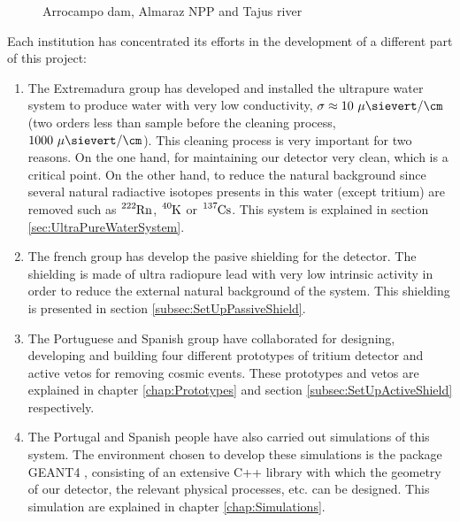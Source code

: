 \begin{figure}[]
 \centering
 \caption{Arrocampo dam, Almaraz NPP and Tajus river}
 \label{fig:Arrocampo}
\end{figure}

Each institution has concentrated its efforts in the development of a different part of this project:

\begin{enumerate}
\item{} The Extremadura group has developed and installed the ultrapure water system to produce water with very low conductivity, $\sigma \approx 10~\mu\sievert/\cm$ (two orders less than sample before the cleaning process, $1000~\mu\sievert/\cm$). This cleaning process is very important for two reasons. On the one hand, for maintaining our detector very clean, which is a critical point. On the other hand, to reduce the natural background since several natural radiactive isotopes presents in this water (except tritium) are removed such as $\ce{^{222}Rn}$, $\ce{^{40}K}$ or $\ce{^{137}Cs}$. This system is explained in section \ref{sec:UltraPureWaterSystem}.

\item{} The french group has develop the pasive shielding for the detector. The shielding is made of ultra radiopure lead with very low intrinsic activity in order to reduce the external natural background of the system. This shielding is presented in section \ref{subsec:SetUpPassiveShield}.

\item{} The Portuguese and Spanish group have collaborated for designing, developing and building four different prototypes of tritium detector and active vetos for removing cosmic events. These prototypes and vetos are explained in chapter \ref{chap:Prototypes} and section \ref{subsec:SetUpActiveShield} respectively.

\item{} The Portugal and Spanish people have also carried out simulations of this system. The environment chosen to develop these simulations is the package GEANT4 \cite{Geant4WebPage}, consisting of an extensive C++ library with which the geometry of our detector, the relevant physical processes, etc. can be designed. This simulation are explained in chapter \ref{chap:Simulations}.

\end{enumerate}

